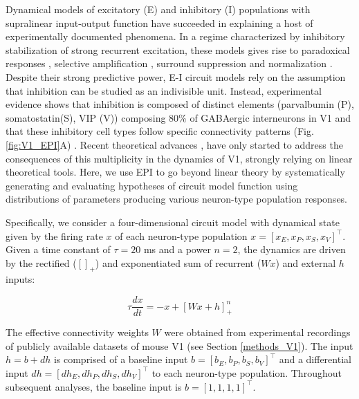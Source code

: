 \documentclass[11pt]{article}
\begin{document}
Dynamical models of excitatory (E) and inhibitory (I) populations with supralinear input-output function have succeeded in explaining a host of experimentally documented phenomena.
In a regime characterized by inhibitory stabilization of strong recurrent excitation, these models gives rise to paradoxical responses \cite{tsodyks1997paradoxical}, selective amplification  \cite{murphy2009balanced}, surround suppression \cite{ozeki2009inhibitory} and normalization \cite{rubin2015stabilized}. 
Despite their strong predictive power, E-I circuit models rely on the assumption that inhibition can be studied as an indivisible unit. 
Instead, experimental evidence shows that inhibition is composed of distinct elements (parvalbumin (P), somatostatin(S), VIP (V))
composing 80\% of GABAergic interneurons in V1 \cite{markram2004interneurons, rudy2011three, tremblay2016} and that these inhibitory cell types follow specific connectivity patterns (Fig. \ref{fig:V1_EPI}A) \cite{pfeffer2013inhibition}.
Recent theoretical advances \cite{litwin2016inhibitory, GarciaDelMolino2017, Chen2019},  have only started to address the consequences of this multiplicity in the dynamics of V1, strongly relying on linear theoretical tools. 
Here, we use EPI to go beyond linear theory by systematically generating and evaluating hypotheses of circuit model function using distributions of parameters producing various neuron-type population responses.

Specifically, we consider a four-dimensional circuit model with dynamical state given by the firing rate $x$ of each neuron-type population $x = \left[x_E, x_P , x_S, x_V \right]^\top$. Given a time constant of $\tau = 20$ ms and a power $n = 2$, the dynamics are driven by the rectified ($\left[ \right]_+$) and exponentiated sum of recurrent ($Wx$) and external $h$ inputs:

\begin{equation}
\tau \frac{dx}{dt} = -x + [W x+ h]_+^n
\end{equation}

The effective connectivity weights $W$ were obtained from experimental recordings of publicly available datasets of mouse V1 \cite{allen2018layer, billeh2019systematic} (see Section \ref{methods_V1}).
The input $h = b + dh$ is comprised of a baseline input  $b = \left[ b_E, b_P , b_S , b_V \right]^\top$ and a differential input $dh = \left[ dh_E , dh_P , dh_S , dh_V\right]^\top$ to each neuron-type population.  
Throughout subsequent analyses, the baseline input is $b = \left[ 1 ,1,1,1\right]^\top$. 
\end{document}
